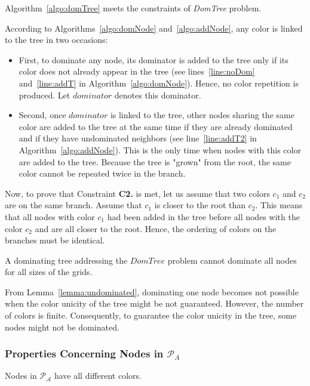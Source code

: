 \begin{theorem}\label{theo:trueAlgo}
Algorithm~\ref{algo:domTree} meets the constraints of \textit{DomTree} problem.\end{theorem}

\proof
According to Algorithms~\ref{algo:domNode} and~\ref{algo:addNode}, any color is linked to the tree in two occasions:
\begin{itemize}
\item First, to dominate any node, its dominator is added to the tree only if its color does not already appear in the tree (see lines~\ref{line:noDom} and~\ref{line:addT} in Algorithm~\ref{algo:domNode}). Hence, no color repetition is produced. Let $dominator$ denotes this dominator.
\item Second, once $dominator$ is linked to the tree, other nodes sharing the same color are added to the tree at the same time if they are already dominated and if they have undominated neighbors (see line~\ref{line:addT2} in Algorithm~\ref{algo:addNode}). 
This is the only time when nodes with this color are added to the tree. Because the tree is "grown" from the root, the same color cannot be repeated twice in the branch.
\end{itemize}
Now, to prove that Constraint \textbf{C2.} is met, let us assume that two colors $c_1$ and $c_2$ are on the same branch. Assume that $c_1$ is closer to the root than $c_2$. This means that all nodes with color $c_1$ had been added in the tree before all nodes with the color $c_2$ and are all closer to the root. Hence, the ordering of colors on the branches must be identical.
\endproof

\begin{theorem}\label{theo:cannotDom}
A dominating tree addressing the $DomTree$ problem cannot dominate all nodes for all sizes of the grids.
\end{theorem}

\proof
From Lemma~\ref{lemma:undominated}, dominating one node becomes not possible when the color unicity of the tree might be not guaranteed. However, the number of colors is finite. Consequently, to guarantee the color unicity in the tree, some nodes might not be dominated. 
\endproof

\subsubsection{Properties Concerning Nodes in $\mathcal{P}_{A}$}


\begin{lemma}\label{lemma:diffColors}
Nodes in $\mathcal{P_A}$ have all different colors.
\end{lemma}

